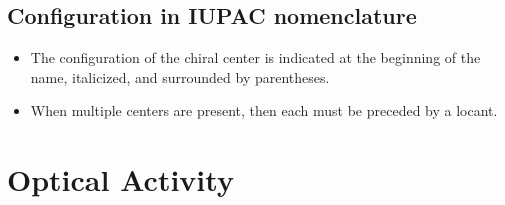 \documentclass{inVerba-notes}
\begin{document}
\begin{itemize}
    \subsection{Configuration in IUPAC nomenclature}
    \begin{itemize}
        \item The configuration of the chiral center is indicated at the beginning of the name, italicized, and surrounded by parentheses.
        \item When multiple centers are present, then each must be preceded by a locant.
    \end{itemize}
\end{itemize}

\section{Optical Activity}
\end{document}
